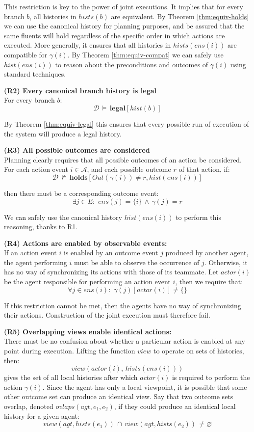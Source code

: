This restriction is key to the power of joint executions. It implies
that for every branch $b$, all histories in $hists(b)$ are equivalent.
By Theorem \ref{thm:equiv-holds} we can use the canonical history
for planning purposes, and be assured that the same fluents will hold
regardless of the specific order in which actions are executed. More
generally, it ensures that all histories in $hists(ens(i))$ are compatible
for $\gamma(i)$. By Theorem \ref{thm:equiv-compat} we can safely
use $hist(ens(i))$ to reason about the preconditions and outcomes
of $\gamma(i)$ using standard techniques.

\textbf{(R2) Every canonical branch history is legal}\\
For every branch $b$: \[
\mathcal{D}\,\models\,\mathbf{legal}[hist(b)]\]


By Theorem \ref{thm:equiv-legal} this ensures that every possible
run of execution of the system will produce a legal history.

\textbf{(R3) All possible outcomes are considered}\\
Planning clearly requires that all possible outcomes of an action
be considered. For each action event $i\in\mathcal{A}$, and each
possible outcome $r$ of that action, if:\[
\mathcal{D}\,\not\models\,\mathbf{holds}[Out(\gamma(i))\neq r,hist(ens(i))]\]


then there must be a corresponding outcome event:\[
\exists j\in E:\,\, ens(j)=\{i\}\,\wedge\,\gamma(j)=r\]


We can safely use the canonical history $hist(ens(i))$ to perform
this reasoning, thanks to R1.

\textbf{(R4) Actions are enabled by observable events:}\\
If an action event $i$ is enabled by an outcome event $j$ produced
by another agent, the agent performing $i$ must be able to observe
the occurrence of $j$. Otherwise, it has no way of synchronizing
its actions with those of its teammate. Let $actor(i)$ be the agent
responsible for performing an action event $i$, then we require that:\[
\forall j\in ens(i):\,\,\gamma(j)[actor(i)]\neq\{\}\]


If this restriction cannot be met, then the agents have no way of
synchronizing their actions. Construction of the joint execution must
therefore fail.

\textbf{(R5) Overlapping views enable identical actions:}\\
There must be no confusion about whether a particular action is enabled
at any point during execution. Lifting the function $view$ to operate
on sets of histories, then:\[
view(actor(i),\, hists(ens(i)))\]
 gives the set of all local histories after which $actor(i)$ is required
to perform the action $\gamma(i)$. Since the agent has only a local
viewpoint, it is possible that some other outcome set can produce
an identical view. Say that two outcome sets overlap, denoted $ovlaps(agt,e_{1},e_{2})$,
if they could produce an identical local history for a given agent:\[
view(agt,hists(e_{1}))\,\cap\, view(agt,hists(e_{2}))\,\neq\varnothing\]


